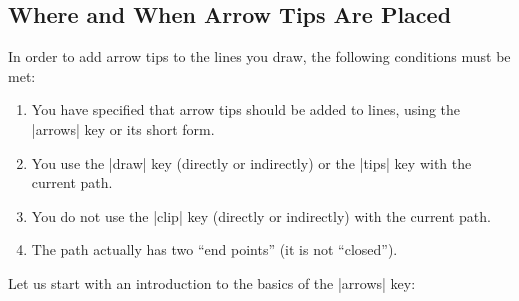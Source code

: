 \subsection{Where and When Arrow Tips Are Placed}
\label{section-arrow-tips-where}

In order to add arrow tips to the lines you draw, the following
conditions must be met:

\begin{enumerate}
\item You have specified that arrow tips should be added to 
  lines, using the |arrows| key or its short form.
\item You use the |draw| key (directly or indirectly) or the |tips|
  key with the current path. 
\item You do not use the |clip| key (directly or indirectly) with the current
  path. 
\item The path actually has two ``end points'' (it is not
  ``closed'').
\end{enumerate}

Let us start with an introduction to the basics of the |arrows| key: 

